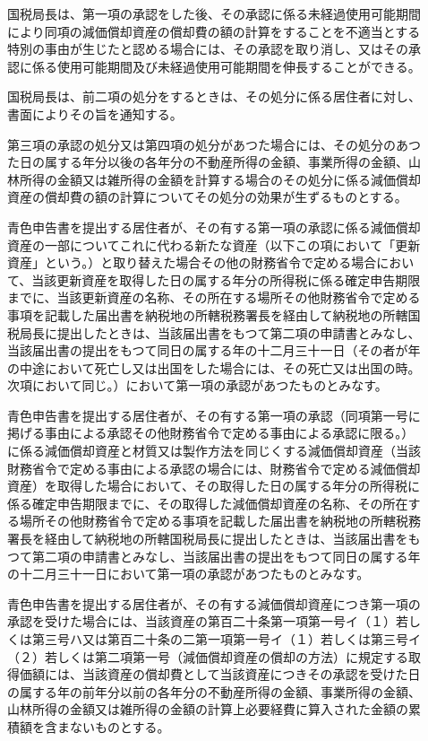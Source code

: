 \documentclass[twocolumn,a4j,10pt]{ltjtarticle}
\begin{document}
\begin{description}
\item[]国税局長は、第一項の承認をした後、その承認に係る未経過使用可能期間により同項の減価償却資産の償却費の額の計算をすることを不適当とする特別の事由が生じたと認める場合には、その承認を取り消し、又はその承認に係る使用可能期間及び未経過使用可能期間を伸長することができる。
\item[]国税局長は、前二項の処分をするときは、その処分に係る居住者に対し、書面によりその旨を通知する。
\item[]第三項の承認の処分又は第四項の処分があつた場合には、その処分のあつた日の属する年分以後の各年分の不動産所得の金額、事業所得の金額、山林所得の金額又は雑所得の金額を計算する場合のその処分に係る減価償却資産の償却費の額の計算についてその処分の効果が生ずるものとする。
\item[]青色申告書を提出する居住者が、その有する第一項の承認に係る減価償却資産の一部についてこれに代わる新たな資産（以下この項において「更新資産」という。）と取り替えた場合その他の財務省令で定める場合において、当該更新資産を取得した日の属する年分の所得税に係る確定申告期限までに、当該更新資産の名称、その所在する場所その他財務省令で定める事項を記載した届出書を納税地の所轄税務署長を経由して納税地の所轄国税局長に提出したときは、当該届出書をもつて第二項の申請書とみなし、当該届出書の提出をもつて同日の属する年の十二月三十一日（その者が年の中途において死亡し又は出国をした場合には、その死亡又は出国の時。次項において同じ。）において第一項の承認があつたものとみなす。
\item[]青色申告書を提出する居住者が、その有する第一項の承認（同項第一号に掲げる事由による承認その他財務省令で定める事由による承認に限る。）に係る減価償却資産と材質又は製作方法を同じくする減価償却資産（当該財務省令で定める事由による承認の場合には、財務省令で定める減価償却資産）を取得した場合において、その取得した日の属する年分の所得税に係る確定申告期限までに、その取得した減価償却資産の名称、その所在する場所その他財務省令で定める事項を記載した届出書を納税地の所轄税務署長を経由して納税地の所轄国税局長に提出したときは、当該届出書をもつて第二項の申請書とみなし、当該届出書の提出をもつて同日の属する年の十二月三十一日において第一項の承認があつたものとみなす。
\item[]青色申告書を提出する居住者が、その有する減価償却資産につき第一項の承認を受けた場合には、当該資産の第百二十条第一項第一号イ（１）若しくは第三号ハ又は第百二十条の二第一項第一号イ（１）若しくは第三号イ（２）若しくは第二項第一号（減価償却資産の償却の方法）に規定する取得価額には、当該資産の償却費として当該資産につきその承認を受けた日の属する年の前年分以前の各年分の不動産所得の金額、事業所得の金額、山林所得の金額又は雑所得の金額の計算上必要経費に算入された金額の累積額を含まないものとする。

\end{description}
\end{document}
